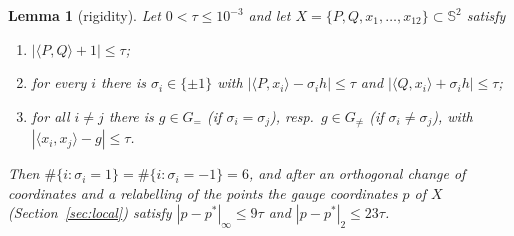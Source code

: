 \documentclass[11pt]{article}
\newtheorem{lemma}[theorem]{Lemma}
\theoremstyle{definition}
\newcommand{\Sph}{\mathbb{S}^2}
\newcommand{\ip}[2]{\langle #1,#2\rangle}
\begin{document}
\begin{lemma}[rigidity]\label{lem:rigidity}
Let $0<\tau\le10^{-3}$ and let $X=\{P,Q,x_1,\dots,x_{12}\}\subset\Sph$ satisfy
\begin{enumerate}[label=(\roman*)]
\item $|\ip PQ+1|\le\tau$;
\item for every $i$ there is $\sigma_i\in\{\pm1\}$ with $|\ip P{x_i}-\sigma_ih|\le\tau$ and $|\ip Q{x_i}+\sigma_ih|\le\tau$;
\item for all $i\neq j$ there is $g\in G_{=}$ (if $\sigma_i=\sigma_j$), resp.\ $g\in G_{\neq}$ (if $\sigma_i\neq\sigma_j$), with
      $|\ip{x_i}{x_j}-g|\le\tau$.
\end{enumerate}
Then $\#\{i:\sigma_i=1\}=\#\{i:\sigma_i=-1\}=6$, and after an orthogonal change of coordinates and a relabelling of the points
the gauge coordinates $p$ of $X$ (Section~\ref{sec:local}) satisfy $|p-p^\ast|_\infty\le 9\tau$ and $|p-p^\ast|_2\le 23\tau$.
\end{lemma}
\end{document}
